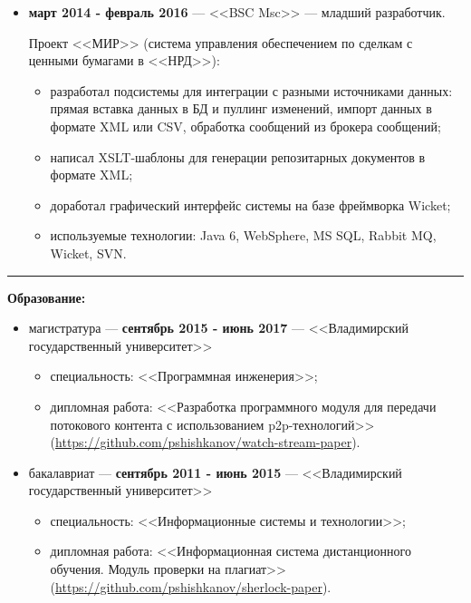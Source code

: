 \documentclass{article}
\begin{document}
{\begin{itemize}
	\item \textbf{март 2014 - февраль 2016} --- <<BSC Msc>> --- младший разработчик.

	Проект <<МИР>> (система управления обеспечением по сделкам с ценными бумагами в <<НРД>>):

	\begin{itemize}		
		\item разработал подсистемы для интеграции с разными источниками данных: прямая вставка данных в БД и пуллинг изменений, импорт данных в формате XML или CSV, обработка сообщений из брокера сообщений;
		\item написал XSLT-шаблоны для генерации репозитарных документов в формате XML;
		\item доработал графический интерфейс системы на базе фреймворка Wicket;
		\item используемые технологии: Java 6, WebSphere, MS SQL, Rabbit MQ, Wicket, SVN.
	\end{itemize}

\end{itemize}
}

\noindent\rule{\textwidth}{0.5pt}

\Large{\textbf{Образование:}}

\normalsize{

\begin{itemize}

	\item магистратура --- \textbf{сентябрь 2015 - июнь 2017} --- <<Владимирский государственный университет>>

	\begin{itemize}		
		\item специальность: <<Программная инженерия>>;
		\item дипломная работа: <<Разработка программного модуля для передачи потокового контента с использованием p2p-технологий>> (\href{https://github.com/pshishkanov/watch-stream-paper}{https://github.com/pshishkanov/watch-stream-paper}).
	\end{itemize}

	\item бакалавриат --- \textbf{сентябрь 2011 - июнь 2015} --- <<Владимирский государственный университет>>

	\begin{itemize}		
		\item специальность: <<Информационные системы и технологии>>;
		\item дипломная работа: <<Информационная система дистанционного обучения. Модуль проверки на плагиат>> (\href{https://github.com/pshishkanov/sherlock-paper}{https://github.com/pshishkanov/sherlock-paper}).		
	\end{itemize}

\end{itemize}
}
\end{document}

